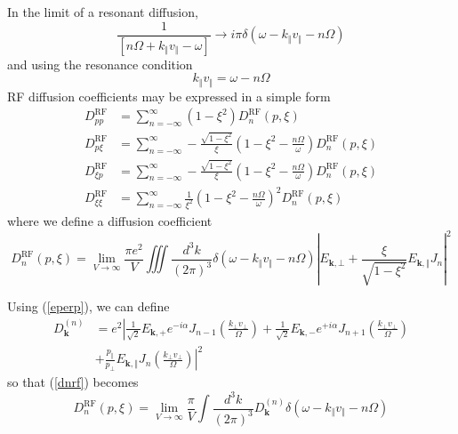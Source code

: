 \bigskip In the limit of a resonant diffusion,
\begin{equation}
\frac{1}{\left[  n\Omega+k_{\Vert}v_{\Vert}-\omega\right]  }\rightarrow
i\pi\delta\left(  \omega-k_{\Vert}v_{\Vert}-n\Omega\right)
\end{equation}
and using the resonance condition
\begin{equation}
k_{\Vert}v_{\Vert}=\omega-n\Omega
\end{equation}
RF diffusion coefficients may be expressed in a simple form
\begin{align}
D_{pp}^{\text{RF}}  &  =\sum_{n=-\infty}^{\infty}\left(  1-\xi^{2}\right)
D_{n}^{\text{RF}}\left(  p,\xi\right) \\
D_{p\xi}^{\text{RF}}  &  =\sum_{n=-\infty}^{\infty}-\frac{\sqrt{1-\xi^{2}}%
}{\xi}\left(  1-\xi^{2}-\frac{n\Omega}{\omega}\right)  D_{n}^{\text{RF}%
}\left(  p,\xi\right) \\
D_{\xi p}^{\text{RF}}  &  =\sum_{n=-\infty}^{\infty}-\frac{\sqrt{1-\xi^{2}}%
}{\xi}\left(  1-\xi^{2}-\frac{n\Omega}{\omega}\right)  D_{n}^{\text{RF}%
}\left(  p,\xi\right) \\
D_{\xi\xi}^{\text{RF}}  &  =\sum_{n=-\infty}^{\infty}\frac{1}{\xi^{2}}\left(
1-\xi^{2}-\frac{n\Omega}{\omega}\right)  ^{2}D_{n}^{\text{RF}}\left(
p,\xi\right)
\end{align}
where we define a diffusion coefficient
\begin{equation}
D_{n}^{\text{RF}}\left(  p,\xi\right)  =\lim_{V\rightarrow\infty}\frac{\pi
e^{2}}{V}\iiint\frac{d^{3}k}{\left(  2\pi\right)  ^{3}}\delta\left(
\omega-k_{\Vert}v_{\Vert}-n\Omega\right)  \left|  E_{\mathbf{k},\bot}%
+\frac{\xi}{\sqrt{1-\xi^{2}}}E_{\mathbf{k},\Vert}J_{n}\right|  ^{2}
\label{dnrf}%
\end{equation}

Using (\ref{eperp}), we can define
\begin{align}
D_{\mathbf{k}}^{(n)}&=e^{2}\left|  \frac{1}{\sqrt{2}}E_{\mathbf{k}%
,+}e^{-i\alpha}J_{n-1}\left(
\frac{k_{\bot}v_{\bot}}{\Omega}\right)
+\frac{1}{\sqrt{2}}E_{\mathbf{k},-}e^{+i\alpha}J_{n+1}\left(
\frac{k_{\bot }v_{\bot}}{\Omega}\right)
\right.\nonumber\\&\left.+\frac{p_{\Vert}}{p_{\bot}}E_{\mathbf{k},\Vert
}J_{n}\left(  \frac{k_{\bot}v_{\bot}}{\Omega}\right)  \right|  ^{2} \label{dk}%
\end{align}
so that (\ref{dnrf}) becomes
\begin{equation}
D_{n}^{\text{RF}}(p,\xi)=\lim_{V\rightarrow\infty}\frac{\pi}{V}\int\frac
{d^{3}k}{(2\pi)^{3}}D_{\mathbf{k}}^{(n)}\delta(\omega-k_{\Vert}v_{\Vert
}-n\Omega)
\end{equation}

